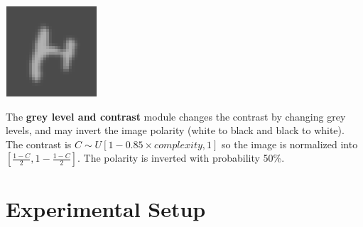 \documentclass{article} %
\begin{document}
\begin{minipage}[t]{0.15\linewidth}
\centering
\vspace*{0mm}
\includegraphics[scale=.4]{images/Contrast_only.png}
\end{minipage}%
\hspace{3mm}\begin{minipage}[t]{0.85\linewidth}
\vspace*{1mm}
The {\bf grey level and contrast} module changes the contrast by changing grey levels, and may invert the image polarity (white
to black and black to white). The contrast is $C \sim U[1-0.85 \times complexity,1]$ 
so the image is normalized into $[\frac{1-C}{2},1-\frac{1-C}{2}]$. The
polarity is inverted with probability 50\%.
\end{minipage}

\section{Experimental Setup}
\end{document}
